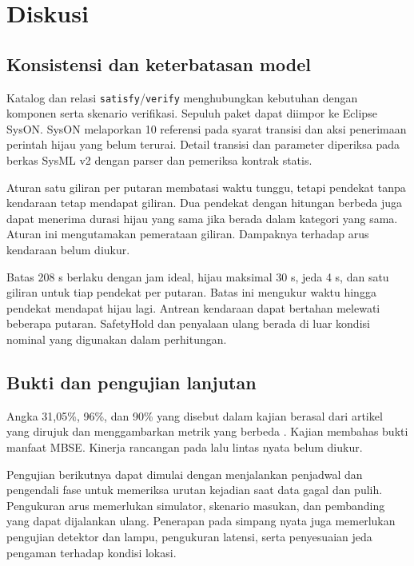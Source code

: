 \section{Diskusi}
\subsection{Konsistensi dan keterbatasan model}
Katalog dan relasi \texttt{satisfy}/\texttt{verify} menghubungkan kebutuhan dengan komponen serta skenario verifikasi. Sepuluh paket dapat diimpor ke Eclipse SysON. SysON melaporkan 10 referensi pada syarat transisi dan aksi penerimaan perintah hijau yang belum terurai. Detail transisi dan parameter diperiksa pada berkas SysML v2 dengan parser dan pemeriksa kontrak statis.

Aturan satu giliran per putaran membatasi waktu tunggu, tetapi pendekat tanpa kendaraan tetap mendapat giliran. Dua pendekat dengan hitungan berbeda juga dapat menerima durasi hijau yang sama jika berada dalam kategori yang sama. Aturan ini mengutamakan pemerataan giliran. Dampaknya terhadap arus kendaraan belum diukur.

Batas 208 s berlaku dengan jam ideal, hijau maksimal 30 s, jeda 4 s, dan satu giliran untuk tiap pendekat per putaran. Batas ini mengukur waktu hingga pendekat mendapat hijau lagi. Antrean kendaraan dapat bertahan melewati beberapa putaran. SafetyHold dan penyalaan ulang berada di luar kondisi nominal yang digunakan dalam perhitungan.

\subsection{Bukti dan pengujian lanjutan}
Angka 31,05\%, 96\%, dan 90\% yang disebut dalam kajian berasal dari artikel yang dirujuk dan menggambarkan metrik yang berbeda \parencite{mondal2022,mathiane2023}. Kajian \textcite{campo2023} membahas bukti manfaat MBSE. Kinerja rancangan pada lalu lintas nyata belum diukur.

Pengujian berikutnya dapat dimulai dengan menjalankan penjadwal dan pengendali fase untuk memeriksa urutan kejadian saat data gagal dan pulih. Pengukuran arus memerlukan simulator, skenario masukan, dan pembanding yang dapat dijalankan ulang. Penerapan pada simpang nyata juga memerlukan pengujian detektor dan lampu, pengukuran latensi, serta penyesuaian jeda pengaman terhadap kondisi lokasi.
